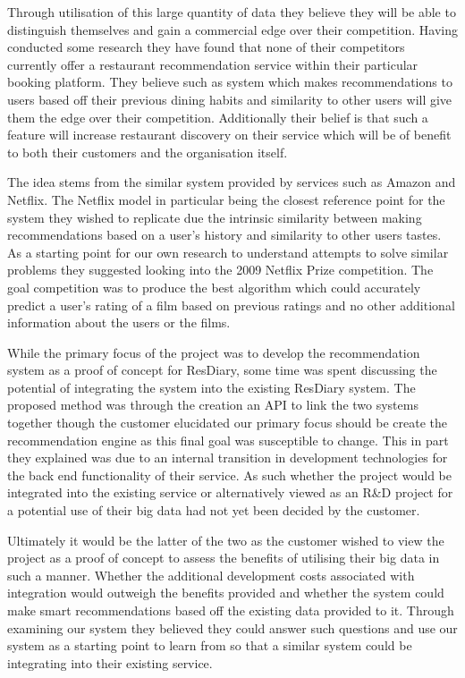 \documentclass{l3proj}
\begin{document}
Through utilisation of this large quantity of data they believe they will be able to distinguish themselves and gain a commercial edge over their competition. Having conducted some research they have found that none of their competitors currently offer a restaurant recommendation service within their particular booking platform. They believe such as system which makes recommendations to users based off their previous dining habits and similarity to other users will give them the edge over their competition. Additionally their belief is that such a feature will increase restaurant discovery on their service which will be of benefit to both their customers and the organisation itself.

The idea stems from the similar system provided by services such as Amazon and Netflix. The Netflix model in particular being the closest reference point for the system they wished to replicate due the intrinsic similarity between making recommendations based on a user’s history and similarity to other users tastes. As a starting point for our own research to understand attempts to solve similar problems they suggested looking into the 2009 Netflix Prize competition. The goal competition was to produce the best algorithm which could accurately predict a user’s rating of a film based on previous ratings and no other additional information about the users or the films.

While the primary focus of the project was to develop the recommendation system as a proof of concept for ResDiary, some time was spent discussing the potential of integrating the system into the existing ResDiary system. The proposed method was through the creation an API to link the two systems together though the customer elucidated our primary focus should be create the recommendation engine as this final goal was susceptible to change. This in part they explained was due to an internal transition in development technologies for the back end functionality of their service. As such whether the project would be integrated into the existing service or alternatively viewed as an R\&D project for a potential use of their big data had not yet been decided by the customer. 

Ultimately it would be the latter of the two as the customer wished to view the project as a proof of concept to assess the benefits of utilising their big data in such a manner. Whether the additional development costs associated with integration would outweigh the benefits provided and whether the system could make smart recommendations based off the existing data provided to it. Through examining our system they believed they could answer such questions and use our system as a starting point to learn from so that a similar system could be integrating into their existing service.
\end{document}
